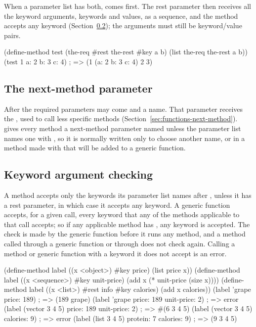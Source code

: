 When a parameter list has both,  comes first. The rest
parameter then receives all the keyword arguments, keywords and values, as a
sequence, and the method accepts any keyword
(Section~\ref{sec:functions-keyword-checking}); the arguments must still be
keyword/value pairs.

\begin{dylan}
(define-method test (the-req #rest the-rest #key a b)
  (list the-req the-rest a b))
(test 1 a: 2 b: 3 c: 4)              ; => (1 (a: 2 b: 3 c: 4) 2 3)
\end{dylan}

\subsection{The next-method parameter}

After the required parameters may come  and a name. That
parameter receives the , used to call less specific
methods (Section~\ref{sec:functions-next-method}).  gives every
method a next-method parameter named  unless the parameter
list names one with , so it is normally written only to choose
another name, or in a method made with  that will be added to a
generic function.

\subsection{Keyword argument checking}\label{sec:functions-keyword-checking}

A method accepts only the keywords its parameter list names after
, unless it has a rest parameter, in which case it accepts any
keyword. A generic function accepts, for a given call, every keyword that
any of the methods applicable to that call accepts; so if any applicable
method has , any keyword is accepted. The check is made by the
generic function before it runs any method, and a method called through a
generic function or through  does not check again.
Calling a method or generic function with a keyword it does not accept is an
error.

\begin{dylan}
(define-method label ((x <object>) #key price)
  (list price x))
(define-method label ((x <sequence>) #key unit-price)
  (add x (* unit-price (size x))))
(define-method label ((x <list>) #rest info #key calories)
  (add x calories))
(label 'grape price: 189)                       ; => (189 grape)
(label 'grape price: 189 unit-price: 2)         ; => error
(label (vector 3 4 5) price: 189 unit-price: 2) ; => #(6 3 4 5)
(label (vector 3 4 5) calories: 9)              ; => error
(label (list 3 4 5) protein: 7 calories: 9)     ; => (9 3 4 5)
\end{dylan}

